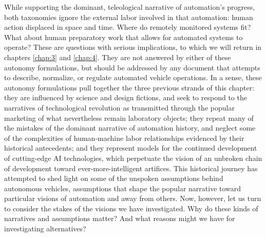 While supporting the dominant, teleological narrative of automation's
progress, both
taxonomies ignore the external labor involved in that automation:
human action displaced in space and time. Where do remotely monitored
systems fit? What about human preparatory work that allows for
automated systems to operate? These are questions with serious
implications, to which we will
return in chapters \ref{chap:3} and \ref{chap:4}. They are not
answered by either of these autonomy formulations, but should be
addressed by any document that attempts to describe, normalize, or
regulate automated vehicle operations. In a sense, these autonomy
formulations pull together the three previous strands of this
chapter: they are influenced by science and design fictions, and seek
to respond to the narratives of technological revolution as
transmitted through the popular marketing of what nevertheless remain laboratory
objects; they repeat many of the mistakes of the dominant narrative of
automation history, and neglect some of the complexities of
human-machine labor relationships evidenced by their historical
antecedents; and they represent models for the
continued development of cutting-edge AI technologies, which perpetuate
the vision of an unbroken chain of development toward
ever-more-intelligent artifices. This historical journey has attempted
to shed light on some of the unspoken assumptions behind autonomous
vehicles, assumptions that shape the popular narrative toward
particular visions of automation and away from others. Now, however,
let us turn to consider the stakes of the 
visions we have investigated. Why do these kinds of narratives and
assumptions matter? And what 
reasons might we have for investigating alternatives?




